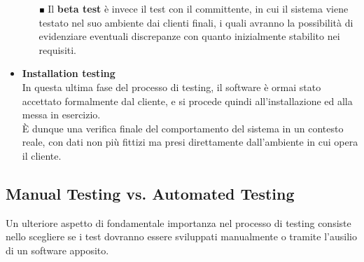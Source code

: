 \begin{itemize}
\begin{itemize}
\item [$ \Blacksquare $] Il \textbf{beta test} è invece il test con il committente, in cui il sistema viene testato nel suo ambiente dai clienti finali, i quali avranno la possibilità di evidenziare eventuali discrepanze con quanto inizialmente stabilito nei requisiti.\\
\end{itemize}


\item \textbf{Installation testing}\\
In questa ultima fase del processo di testing, il software è ormai stato accettato formalmente dal cliente, e si procede quindi all'installazione ed alla messa in esercizio.\\
È dunque una verifica finale del comportamento del sistema in un contesto reale, con dati non più fittizi ma presi direttamente dall'ambiente in cui opera il cliente.\\

\end{itemize}

\clearpage

\subsection{Manual Testing vs. Automated Testing}
Un ulteriore aspetto di fondamentale importanza nel processo di testing consiste nello scegliere se i test dovranno essere sviluppati manualmente o tramite l'ausilio di un software apposito.\\

